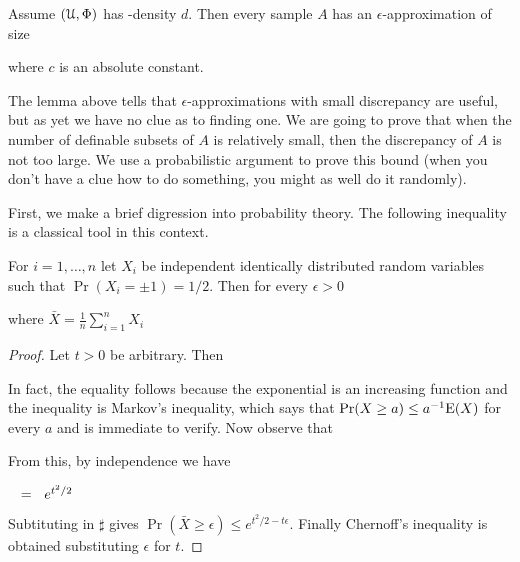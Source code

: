 \documentclass[sputnik.tex]{subfiles}
\begin{document}
\begin{theorem}\label{thm_epsilon_approx}
Assume $(\EuScript U,\Phi)$ has \vc-density $d$. Then every sample $A$ has an $\epsilon$-approximation of size 


where $c$ is an absolute constant.
\end{theorem}



The lemma above tells that $\epsilon$-approximations with small discrepancy are useful, but as yet we have no clue as to finding one.
We are going to prove that when the number of definable subsets of $A$ is relatively small, then the discrepancy of $A$ is not too large.
We use a probabilistic argument to prove this bound (when you don't have a clue how to do something, you might as well do it randomly).

First, we make a brief digression into probability theory.
The following inequality is a classical tool in this context.

\begin{lemma}\label{Chernoff}
For $i=1,\dots,n$ let $X_i$ be independent identically distributed random variables such that\/ $\Pr(X_i=\pm1)=1/2$.
Then for every $\epsilon>0$

\hfill where $\displaystyle \bar X=\frac1n\sum^n_{i=1}X_i$
\end{lemma}
\begin{proof}
Let $t>0$ be arbitrary.
Then



In fact, the equality follows because the exponential is an increasing function and the inequality is Markov's inequality, which says that $\Pr(X\ge a)\le a^{-1}{\rm E}(X)$ for every $a$ and is immediate to verify.
Now observe that






From this, by independence we have 

$\medrel{=}e^{t^2/2}$


Subtituting in $\sharp$ gives $\Pr(\bar X\ge\epsilon)\le e^{t^2/2-t\epsilon}$.
Finally Chernoff's inequality is obtained substituting $\epsilon$ for $t$.
\end{proof}
\end{document}
